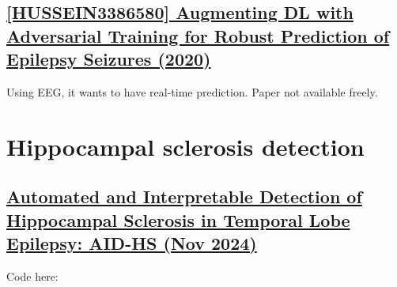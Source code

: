 \newpage
\subsection{\href{https://dl.acm.org/doi/abs/10.1145/3386580}{[HUSSEIN3386580] Augmenting DL with Adversarial Training for Robust Prediction of Epilepsy Seizures (2020) }}

Using EEG, it wants to have real-time prediction. Paper not available freely.

\newpage
\section{Hippocampal sclerosis detection}
\label{hs}

\subsection{\href{https://onlinelibrary.wiley.com/doi/full/10.1002/ana.27089}{Automated and Interpretable Detection of Hippocampal Sclerosis in Temporal Lobe Epilepsy: AID-HS (Nov 2024)}}
\label{hs1}

Code here: 

